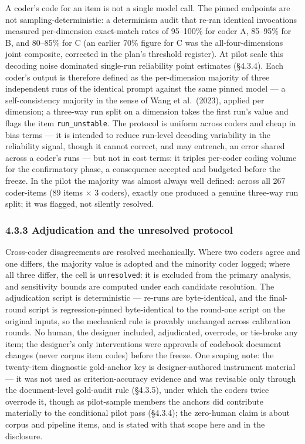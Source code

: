 A coder's code for an item is not a single model call. The pinned endpoints are not sampling-deterministic: a determinism audit that re-ran identical invocations measured per-dimension exact-match rates of 95--100\% for coder A, 85--95\% for B, and 80--85\% for C (an earlier 70\% figure for C was the all-four-dimensions joint composite, corrected in the plan's threshold register). At pilot scale this decoding noise dominated single-run reliability point estimates (\S{}4.3.4). Each coder's output is therefore defined as the per-dimension majority of three independent runs of the identical prompt against the same pinned model --- a self-consistency majority in the sense of Wang et al.~(2023), applied per dimension; a three-way run split on a dimension takes the first run's value and flags the item \texttt{run\_unstable}. The protocol is uniform across coders and cheap in bias terms --- it is intended to reduce run-level decoding variability in the reliability signal, though it cannot correct, and may entrench, an error shared across a coder's runs --- but not in cost terms: it triples per-coder coding volume for the confirmatory phase, a consequence accepted and budgeted before the freeze. In the pilot the majority was almost always well defined: across all 267 coder-items (89 items $\times$ 3 coders), exactly one produced a genuine three-way run split; it was flagged, not silently resolved.

\subsubsection{4.3.3 Adjudication and the unresolved protocol}\label{adjudication-and-the-unresolved-protocol}

Cross-coder disagreements are resolved mechanically. Where two coders agree and one differs, the majority value is adopted and the minority coder logged; where all three differ, the cell is \texttt{unresolved}: it is excluded from the primary analysis, and sensitivity bounds are computed under each candidate resolution. The adjudication script is deterministic --- re-runs are byte-identical, and the final-round script is regression-pinned byte-identical to the round-one script on the original inputs, so the mechanical rule is provably unchanged across calibration rounds. No human, the designer included, adjudicated, overrode, or tie-broke any item; the designer's only interventions were approvals of codebook document changes (never corpus item codes) before the freeze. One scoping note: the twenty-item diagnostic gold-anchor key is designer-authored instrument material --- it was not used as criterion-accuracy evidence and was revisable only through the document-level gold-audit rule (\S{}4.3.5), under which the coders twice overrode it, though as pilot-sample members the anchors did contribute materially to the conditional pilot pass (\S{}4.3.4); the zero-human claim is about corpus and pipeline items, and is stated with that scope here and in the disclosure.

